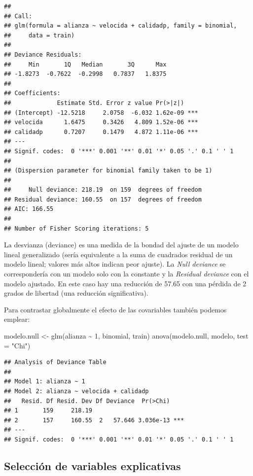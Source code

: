 \documentclass[
]{book}
\newenvironment{Shaded}{\begin{snugshade}}{\end{snugshade}}
\newcommand{\AttributeTok}[1]{\textcolor[rgb]{0.77,0.63,0.00}{#1}}
\newcommand{\DecValTok}[1]{\textcolor[rgb]{0.00,0.00,0.81}{#1}}
\newcommand{\FunctionTok}[1]{\textcolor[rgb]{0.00,0.00,0.00}{#1}}
\newcommand{\NormalTok}[1]{#1}
\newcommand{\OtherTok}[1]{\textcolor[rgb]{0.56,0.35,0.01}{#1}}
\newcommand{\SpecialCharTok}[1]{\textcolor[rgb]{0.00,0.00,0.00}{#1}}
\newcommand{\StringTok}[1]{\textcolor[rgb]{0.31,0.60,0.02}{#1}}
\theoremstyle{break}
\theoremstyle{definition}
\theoremstyle{definition}
\theoremstyle{definition}
\theoremstyle{definition}
\theoremstyle{remark}
\begin{document}
\begin{verbatim}
## 
## Call:
## glm(formula = alianza ~ velocida + calidadp, family = binomial, 
##     data = train)
## 
## Deviance Residuals: 
##     Min       1Q   Median       3Q      Max  
## -1.8273  -0.7622  -0.2998   0.7837   1.8375  
## 
## Coefficients:
##             Estimate Std. Error z value Pr(>|z|)    
## (Intercept) -12.5218     2.0758  -6.032 1.62e-09 ***
## velocida      1.6475     0.3426   4.809 1.52e-06 ***
## calidadp      0.7207     0.1479   4.872 1.11e-06 ***
## ---
## Signif. codes:  0 '***' 0.001 '**' 0.01 '*' 0.05 '.' 0.1 ' ' 1
## 
## (Dispersion parameter for binomial family taken to be 1)
## 
##     Null deviance: 218.19  on 159  degrees of freedom
## Residual deviance: 160.55  on 157  degrees of freedom
## AIC: 166.55
## 
## Number of Fisher Scoring iterations: 5
\end{verbatim}

La desvianza (deviance) es una medida de la bondad del ajuste de un modelo lineal generalizado (sería equivalente a la suma de cuadrados residual de un modelo lineal; valores más altos indican peor ajuste).
La \emph{Null deviance} se correspondería con un modelo solo con la constante y la \emph{Residual deviance} con el modelo ajustado.
En este caso hay una reducción de 57.65 con una pérdida de 2 grados de libertad (una reducción significativa).

Para contrastar globalmente el efecto de las covariables también podemos emplear:

\begin{Shaded}
\begin{Highlighting}[]
\NormalTok{modelo.null }\OtherTok{\textless{}{-}} \FunctionTok{glm}\NormalTok{(alianza }\SpecialCharTok{\textasciitilde{}} \DecValTok{1}\NormalTok{, binomial, train)}
\FunctionTok{anova}\NormalTok{(modelo.null, modelo, }\AttributeTok{test =} \StringTok{"Chi"}\NormalTok{)}
\end{Highlighting}
\end{Shaded}

\begin{verbatim}
## Analysis of Deviance Table
## 
## Model 1: alianza ~ 1
## Model 2: alianza ~ velocida + calidadp
##   Resid. Df Resid. Dev Df Deviance  Pr(>Chi)    
## 1       159     218.19                          
## 2       157     160.55  2   57.646 3.036e-13 ***
## ---
## Signif. codes:  0 '***' 0.001 '**' 0.01 '*' 0.05 '.' 0.1 ' ' 1
\end{verbatim}

\hypertarget{selecciuxf3n-de-variables-explicativas}{%
\subsection{Selección de variables explicativas}\label{selecciuxf3n-de-variables-explicativas}}
\end{document}
